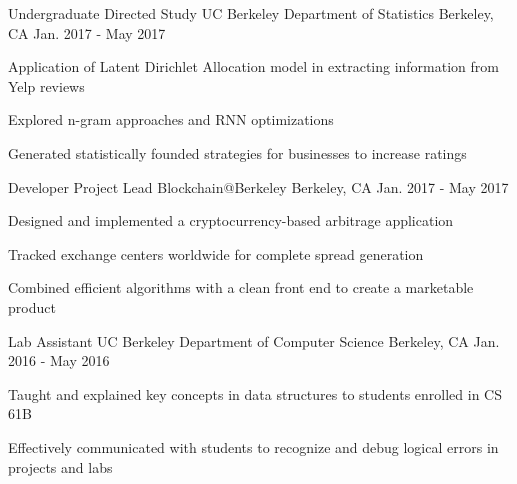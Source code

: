 

\begin{cventries}

  \cventry
    {Undergraduate Directed Study} %
    {UC Berkeley Department of Statistics} %
    {Berkeley, CA} %
    {Jan. 2017 - May 2017} %
    {
      \begin{cvitems} %
        \item {Application of Latent Dirichlet Allocation model in extracting information from Yelp reviews}
        \item {Explored n-gram approaches and RNN optimizations}
        \item {Generated statistically founded strategies for businesses to increase ratings}
      \end{cvitems}
    }
  \cventry
    {Developer Project Lead} %
    {Blockchain@Berkeley} %
    {Berkeley, CA} %
    {Jan. 2017 - May 2017} %
    {
      \begin{cvitems} %
        \item {Designed and implemented a cryptocurrency-based arbitrage application}
        \item {Tracked exchange centers worldwide for complete spread generation}
        \item {Combined efficient algorithms with a clean front end to create a marketable product}
      \end{cvitems}
      \vspace{2.0mm}
    }
  \cventry
    {Lab Assistant} %
    {UC Berkeley Department of Computer Science} %
    {Berkeley, CA} %
    {Jan. 2016 - May 2016} %
    {
      \begin{cvitems} %
        \item {Taught and explained key concepts in data structures to students enrolled in CS 61B}
        \item {Effectively communicated with students to recognize and debug logical errors in projects and labs}
      \end{cvitems}
    }
\end{cventries}
